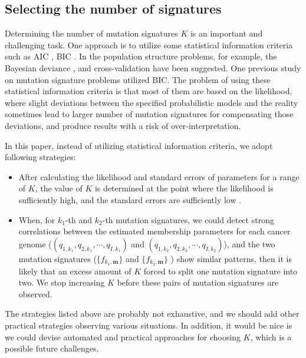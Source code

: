 \subsection*{Selecting the number of signatures}

Determining the number of mutation signatures $K$ is an important and challenging task. 
One approach is to utilize some statistical information criteria such as AIC \cite{akaike1974new}, BIC \cite{schwarz1978estimating}.
In the population structure problems, for example, 
the Bayesian deviance \cite{pmid10835412}, 
and cross-validation \cite{alexander2011enhancements} have been suggested.
One previous study on mutation signature problems \cite{pmid23628380} utilized BIC.
The problem of using these statistical information criteria is that most of them are based on the likelihood,
where slight deviations between the specified probabilistic models and the reality sometimes lead to 
larger number of mutation signatures for compensating those deviations,
and produce results with a risk of over-interpretation.

In this paper, instead of utilizing statistical information criteria,
we adopt following strategies:

\begin{itemize}
\item
After calculating the likelihood and standard errors of parameters for a range of $K$,
the value of $K$ is determined at the point where the likelihood is sufficiently high, 
and the standard errors are sufficiently low \cite{pmid23318258}.

\item
When, for $k_1$-th and $k_2$-th mutation signatures, 
we could detect strong correlations between the estimated membership parameters 
for each cancer genome
($(q_{1,k_1}, q_{2,k_1}, \cdots, q_{I,k_1})$ and $(q_{1,k_2}, q_{2,k_2}, \cdots, q_{I,k_2})$),
and the two mutation signatures ($\{ f_{k_1, \bm{m} } \}$ and $\{ f_{k_2, \bm{m} } \}$ ) show similar patterns,
then it is likely that an excess amount of $K$ forced to split one mutation signature into two.
We stop increasing $K$ before these pairs of mutation signatures are observed.

\end{itemize}

The strategies listed above are probably not exhaustive, 
and we should add other practical strategies observing various situations.
In addition, it would be nice is we could devise automated and practical approaches for choosing $K$,
which is a possible future challenges.



